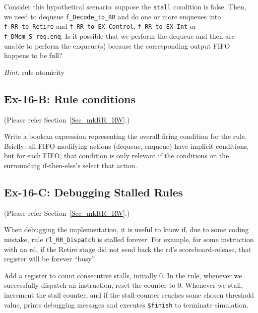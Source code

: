 Consider this hypothetical scenario: suppose the \verb|stall|
condition is false.  Then, we need to dequeue \verb|f_Decode_to_RR|
and do one or more enqueues into \verb|f_RR_to_Retire| and
\verb|f_RR_to_EX_Control|, \verb|f_RR_to_EX_Int| or
\verb|f_DMem_S_req.enq|.  Is it possible that we perform the dequeue
and then are unable to perform the enqueue(s) because the
corresponding output FIFO happens to be full?

\emph{Hint:} rule atomicity


\subsection*{Ex-16-B: Rule conditions}
\label{Ex-16-B-Rule-Conditions}

(Please refer Section~\ref{Sec_mkRR_RW}.)

Write a boolean expression representing the overall firing condition
for the rule.  Briefly: all FIFO-modifying actions (dequeue, enqueue)
have implicit conditions, but for each FIFO, that condition is only
relevant if the conditions on the surrounding if-then-else's select
that action.


\subsection*{Ex-16-C: Debugging Stalled Rules}
\label{Ex-16-C-Debugging-Stalled-Rules}

(Please refer Section~\ref{Sec_mkRR_RW}.)

When debugging the implementation, it is useful to know if, due to
some coding mistake, rule \verb|rl_RR_Dispatch| is stalled forever.
For example, for some instruction with an rd, if the Retire stage did
not send back the rd's scoreboard-release, that register will be
forever ``busy''.

Add a register to count consecutive stalls, initially 0.  In the rule,
whenever we successfully dispatch an instruction, reset the counter to
0.  Whenever we stall, increment the stall counter, and if the
stall-counter reaches some chosen threshold value, prints debugging
messages and executes \verb|$finish| to terminate simulation.


